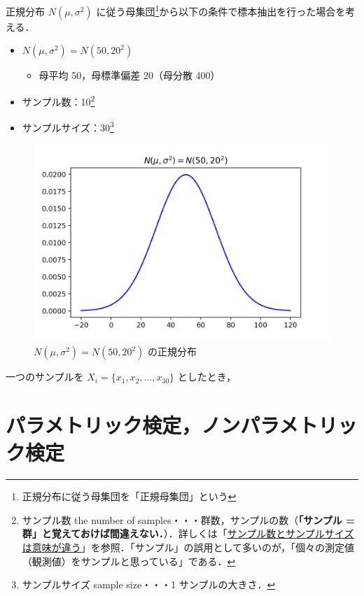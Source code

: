 正規分布 $N(\mu, \sigma^2)$ に従う母集団\footnote{正規分布に従う母集団を「正規母集団」という}から以下の条件で標本抽出を行った場合を考える．

\begin{itemize}
  \item $N(\mu, \sigma^2) = N(50, 20^2)$
        \begin{itemize}
          \item 母平均 50，母標準偏差 20（母分散 400）
        \end{itemize}
  \item サンプル数：10\footnote{サンプル数 the number of samples・・・群数，サンプルの数（\textbf{「サンプル = 群」と覚えておけば間違えない．}）．詳しくは「\href{https://biolab.sakura.ne.jp/sample-size.html}{\underline{サンプル数とサンプルサイズは意味が違う}}」を参照．「サンプル」の誤用として多いのが，「個々の測定値（観測値）をサンプルと思っている」である．}
  \item サンプルサイズ：30\footnote{サンプルサイズ sample size・・・1 サンプルの大きさ．}
\end{itemize}

\begin{figure}[H]
  \begin{center}
    \includegraphics[width=15cm]{images/parts/3/norm-dist.png}
    \caption{$N(\mu, \sigma^2) = N(50, 20^2)$ の正規分布}
  \end{center}
\end{figure}

一つのサンプルを $X_i = \{x_1, x_2, \ldots, x_{30}\}$ としたとき，

\section{パラメトリック検定，ノンパラメトリック検定}
